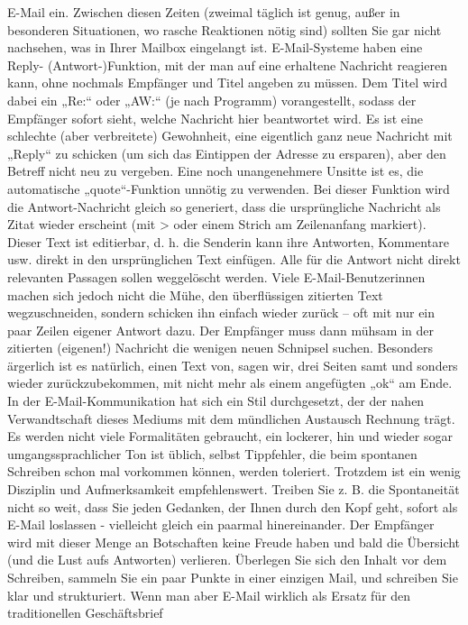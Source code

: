 \documentclass[]{book}
\theoremstyle{definition}
\theoremstyle{definition}
\theoremstyle{definition}
\theoremstyle{remark}
\begin{document}
E-Mail ein. Zwischen diesen Zeiten (zweimal täglich ist genug, außer in
besonderen Situationen, wo rasche Reaktionen nötig sind) sollten Sie gar
nicht nachsehen, was in Ihrer Mailbox eingelangt ist. E-Mail-Systeme
haben eine Reply- (Antwort-)Funktion, mit der man auf eine erhaltene
Nachricht reagieren kann, ohne nochmals Empfänger und Titel angeben zu
müssen. Dem Titel wird dabei ein „Re:`` oder „AW:`` (je nach Programm)
vorangestellt, sodass der Empfänger sofort sieht, welche Nachricht hier
beantwortet wird. Es ist eine schlechte (aber verbreitete) Gewohnheit,
eine eigentlich ganz neue Nachricht mit „Reply`` zu schicken (um sich
das Eintippen der Adresse zu ersparen), aber den Betreff nicht neu zu
vergeben. Eine noch unangenehmere Unsitte ist es, die automatische
„quote``-Funktion unnötig zu verwenden. Bei dieser Funktion wird die
Antwort-Nachricht gleich so generiert, dass die ursprüngliche Nachricht
als Zitat wieder erscheint (mit \textgreater{} oder einem Strich am
Zeilenanfang markiert). Dieser Text ist editierbar, d. h. die Senderin
kann ihre Antworten, Kommentare usw. direkt in den ursprünglichen Text
einfügen. Alle für die Antwort nicht direkt relevanten Passagen sollen
weggelöscht werden. Viele E-Mail-Benutzerinnen machen sich jedoch nicht
die Mühe, den überflüssigen zitierten Text wegzuschneiden, sondern
schicken ihn einfach wieder zurück -- oft mit nur ein paar Zeilen
eigener Antwort dazu. Der Empfänger muss dann mühsam in der zitierten
(eigenen!) Nachricht die wenigen neuen Schnipsel suchen. Besonders
ärgerlich ist es natürlich, einen Text von, sagen wir, drei Seiten samt
und sonders wieder zurückzubekommen, mit nicht mehr als einem angefügten
„ok`` am Ende. In der E-Mail-Kommunikation hat sich ein Stil
durchgesetzt, der der nahen Verwandtschaft dieses Mediums mit dem
mündlichen Austausch Rechnung trägt. Es werden nicht viele Formalitäten
gebraucht, ein lockerer, hin und wieder sogar umgangssprachlicher Ton
ist üblich, selbst Tippfehler, die beim spontanen Schreiben schon mal
vorkommen können, werden toleriert. Trotzdem ist ein wenig Disziplin und
Aufmerksamkeit empfehlenswert. Treiben Sie z. B. die Spontaneität nicht
so weit, dass Sie jeden Gedanken, der Ihnen durch den Kopf geht, sofort
als E-Mail loslassen - vielleicht gleich ein paarmal hinereinander. Der
Empfänger wird mit dieser Menge an Botschaften keine Freude haben und
bald die Übersicht (und die Lust aufs Antworten) verlieren. Überlegen
Sie sich den Inhalt vor dem Schreiben, sammeln Sie ein paar Punkte in
einer einzigen Mail, und schreiben Sie klar und strukturiert. Wenn man
aber E-Mail wirklich als Ersatz für den traditionellen Geschäftsbrief
\end{document}
